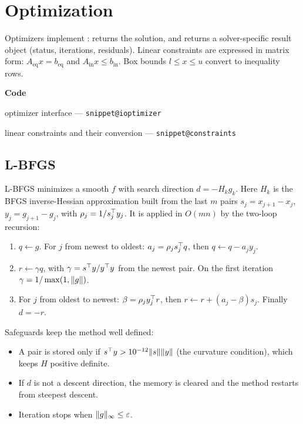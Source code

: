 \documentclass[11pt,a4paper]{article}
\makeatletter
\newcommand{\snippetsource}[1]{\csname snippet@#1\endcsname}
\newenvironment{codepointers}{%
  \par\smallskip\begingroup\footnotesize\noindent\textcolor{blue!50!black}{\textbf{Code}}\par\nopagebreak
  \begin{list}{}{\setlength{\leftmargin}{1.2em}\setlength{\itemsep}{0pt}\setlength{\parsep}{0pt}\setlength{\topsep}{1pt}}}%
  {\end{list}\endgroup\smallskip}
\newcommand{\codeitem}[2]{\item #2 --- \texttt{\snippetsource{#1}}}
\makeatother
\begin{document}
\section{Optimization}\label{sec:optimization}

Optimizers implement :  returns the
solution, and  returns a solver-specific result object (status, iterations,
residuals). Linear constraints are expressed in matrix form:
$A_{\text{eq}}x=b_{\text{eq}}$ and $A_{\text{in}}x\le b_{\text{in}}$. Box bounds
$l\le x\le u$ convert to inequality rows.
\begin{codepointers}
  \codeitem{ioptimizer}{optimizer interface}
  \codeitem{constraints}{linear constraints and their conversion}
\end{codepointers}

\subsection{L-BFGS}\label{sec:lbfgs}
L-BFGS minimizes a smooth $f$ with search direction $d=-H_kg_k$. Here $H_k$ is the BFGS
inverse-Hessian approximation built from the last $m$ pairs
$s_j=x_{j+1}-x_j$, $y_j=g_{j+1}-g_j$, with $\rho_j=1/s_j^\top y_j$. It is applied in $O(mn)$
by the two-loop recursion:
\begin{enumerate}
  \item $q\leftarrow g$. For $j$ from newest to oldest: $a_j=\rho_js_j^\top q$, then
        $q\leftarrow q-a_jy_j$.
  \item $r\leftarrow\gamma q$, with $\gamma=s^\top y/y^\top y$ from the newest pair. On the
        first iteration $\gamma=1/\max(1,\lVert g\rVert)$.
  \item For $j$ from oldest to newest: $\beta=\rho_jy_j^\top r$, then
        $r\leftarrow r+(a_j-\beta)s_j$. Finally $d=-r$.
\end{enumerate}
Safeguards keep the method well defined:
\begin{itemize}
  \item A pair is stored only if $s^\top y>10^{-12}\lVert s\rVert\lVert y\rVert$ (the curvature
        condition), which keeps $H$ positive definite.
  \item If $d$ is not a descent direction, the memory is cleared and the method restarts
        from steepest descent.
  \item Iteration stops when $\lVert g\rVert_\infty\le\varepsilon$.
\end{itemize}
\end{document}
